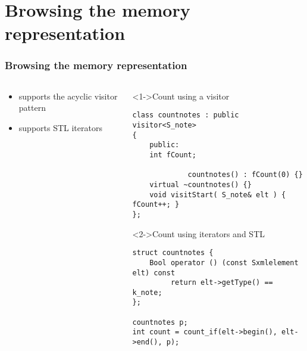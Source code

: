 \documentclass{beamer}
\begin{document}
\section{Browsing the memory representation}
\begin{frame}[fragile]
  \frametitle{Browsing the memory representation}

  \begin{columns}
    \begin{column}[c]{50mm}
    
\begin{itemize}
      \item<1-> supports the acyclic visitor pattern
    \vspace{25mm}
      \item<2-> supports STL iterators
     \end{itemize}
    \end{column}

    \begin{column}[c]{65mm}
    \begin{block}<1->{Count using a visitor}
\begin{lstlisting}
class countnotes : public visitor<S_note>
{
    public:
    int fCount;

             countnotes() : fCount(0) {}
    virtual ~countnotes() {}
    void visitStart( S_note& elt ) { fCount++; }
};
\end{lstlisting}
    \end{block}

    \begin{block}<2->{Count using iterators and STL}
\begin{lstlisting}
struct countnotes {
    Bool operator () (const Sxmlelement elt) const
         return elt->getType() == k_note;
};

countnotes p;
int count = count_if(elt->begin(), elt->end(), p);
\end{lstlisting}
    \end{block}
    \end{column}
  \end{columns}
\end{frame}

\end{document}
